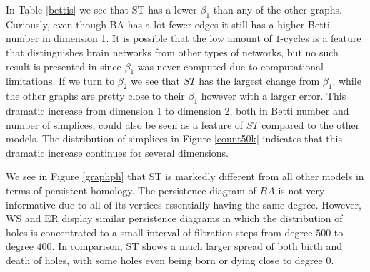 In Table \ref{bettis} we see that ST has a lower $\beta_{1}$ than any of the other graphs. Curiously, even though BA has a lot fewer edges it still has a higher Betti number in dimension 1. It is possible that the low amount of $1$-cycles is a feature that distinguishes brain networks from other types of networks, but no such result is presented in \cite{reimann} since $\beta_{1}$ was never computed due to computational limitations. If we turn to $\beta_{2}$ we see that $ST$ has the largest change from $\beta_{1}$, while the other graphs are pretty close to their $\beta_{1}$ however with a larger error. This dramatic increase from dimension 1 to dimension 2, both in Betti number and number of simplices, could also be seen as a feature of $ST$ compared to the other models. The distribution of simplices in Figure \ref{count50k} indicates that this dramatic increase continues for several dimensions.

We see in Figure \ref{graphph} that ST is markedly different from all other models in terms of persistent homology. The persistence diagram of $BA$ is not very informative due to all of its vertices essentially having the same degree. However, WS and ER display similar persistence diagrams in which the distribution of holes is concentrated to a small interval of filtration steps from degree $500$ to degree $400$. In comparison, ST shows a much larger spread of both birth and death of holes, with some holes even being born or dying close to degree $0$.

